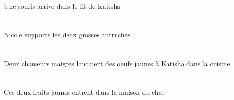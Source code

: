 \begin{exe}
\INDSgAbsP{}   \sourisBSgAbsP{}    \DEFSgOblP{}    \INDSgOblP{}   \KatishaASgOblP{}   \DEP{}   \litDSgOblP{}   \DANSP{}  \arriverViPrsBSgP{}\\
\INDSgAbsG{}   \sourisBSgAbsG{}    \DEFSgOblG{}    \INDSgOblG{}   \KatishaASgOblG{}   \DEG{}   \litDSgOblG{}   \DANSG{}  \arriverViPrsBSgG{}\\
Une souris arrive dans le lit de Katisha
\ex\glll
\INDSgErg{}   \NicoleBSgErg{}   \DEFDuAbs{}   \grosBDu{}   \autrucheBDuAbs{}  \supporterVtPrsBDu{}\\
\INDSgErgP{}   \NicoleBSgErgP{}   \DEFDuAbsP{}   \grosBDuP{}   \autrucheBDuAbsP{}  \supporterVtPrsBDuP{}\\
\INDSgErgG{}   \NicoleBSgErgG{}   \DEFDuAbsG{}   \grosBDuG{}   \autrucheBDuAbsG{}  \supporterVtPrsBDuG{}\\
Nicole supporte les deux grosses autruches
\ex\glll
\DEFSgObl{}   \cuisineDSgObl{}   \DANS{}   \INDDuErg{}   \maigreCDu{}   \chasseurCDuErg{}    \INDSgDat{}   \KatishaASgDat{}   \INDPlAbs{}   \jauneCPl{}   \oeufCPlAbs{}  \lancerVdPstCPl{}\\
\DEFSgOblP{}   \cuisineDSgOblP{}   \DANSP{}   \INDDuErgP{}   \maigreCDuP{}   \chasseurCDuErgP{}    \INDSgDatP{}   \KatishaASgDatP{}   \INDPlAbsP{}   \jauneCPlP{}   \oeufCPlAbsP{}  \lancerVdPstCPlP{}\\
\DEFSgOblG{}   \cuisineDSgOblG{}   \DANSG{}   \INDDuErgG{}   \maigreCDuG{}   \chasseurCDuErgG{}    \INDSgDatG{}   \KatishaASgDatG{}   \INDPlAbsG{}   \jauneCPlG{}   \oeufCPlAbsG{}  \lancerVdPstCPlG{}\\
Deux chasseurs maigres lançaient des oeufs jaunes à Katisha dans la cuisine
\ex\glll
\DEMDuAbs{}   \jauneADu{}   \fruitADuAbs{}    \DEFSgObl{}    \DEFSgObl{}   \chatDSgObl{}   \DE{}   \maisonDSgObl{}   \DANS{}  \entrerViPrsADu{}\\
\DEMDuAbsP{}   \jauneADuP{}   \fruitADuAbsP{}    \DEFSgOblP{}    \DEFSgOblP{}   \chatDSgOblP{}   \DEP{}   \maisonDSgOblP{}   \DANSP{}  \entrerViPrsADuP{}\\
\DEMDuAbsG{}   \jauneADuG{}   \fruitADuAbsG{}    \DEFSgOblG{}    \DEFSgOblG{}   \chatDSgOblG{}   \DEG{}   \maisonDSgOblG{}   \DANSG{}  \entrerViPrsADuG{}\\
Ces deux fruits jaunes entrent dans la maison du chat
\ex\glll
\DEFDuAbs{}   \infirmiereADuAbs{}    \DEFSgObl{}    \DEFSgObl{}   \chasseurCSgObl{}   \DE{}   \chambreBSgObl{}   \DANS{}  \arriverViPrsADu{}\\
\DEFDuAbsP{}   \infirmiereADuAbsP{}    \DEFSgOblP{}    \DEFSgOblP{}   \chasseurCSgOblP{}   \DEP{}   \chambreBSgOblP{}   \DANSP{}  \arriverViPrsADuP{}\\

\end{exe}
